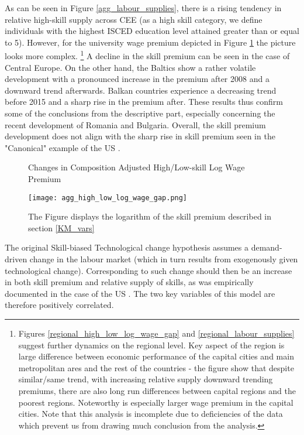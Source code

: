 \documentclass[11pt]{article}
\begin{document}
As can be seen in Figure \ref{agg_labour_supplies}, there is a rising tendency in relative high-skill supply across CEE (as a high skill category, we define individuals with the highest ISCED education level attained greater than or equal to 5). However, for the university wage premium depicted in Figure \ref{agg_high_low_log_wage_gap} the picture looks more complex.%
\footnote{Figures \ref{regional_high_low_log_wage_gap} and  \ref{regional_labour_supplies} suggest further dynamics on the regional level. Key aspect of the region is large difference between economic performance of the capital cities and main metropolitan ares and the rest of the countries - the figure show that despite similar/same trend, with increasing relative supply downward trending premiums, there are also long run differences between capital regions and the poorest regions. Noteworthy is especially larger wage premium in the capital cities. Note that this analysis is incomplete due to deficiencies of the data which prevent us from drawing much conclusion from the analysis.} 
A decline in the skill premium can be seen in the case of Central Europe. On the other hand, the Baltics show a rather volatile development with a pronounced increase in the premium after 2008 and a downward trend afterwards. Balkan countries experience a decreasing trend before 2015 and a sharp rise in the premium after. These results thus confirm some of the conclusions from the descriptive part, especially concerning the recent development of Romania and Bulgaria.
Overall, the skill premium development does not align with the sharp rise in skill premium seen in the "Canonical" example of the US \citep{acemoglu2002directed}. 

\begin{figure}[!htbp]%
    \centering
    \caption{Changes in Composition Adjusted High/Low-skill Log Wage Premium}
    {\texttt{[image: agg\_high\_low\_log\_wage\_gap.png]} }
    \label{agg_high_low_log_wage_gap}
    \caption*{\footnotesize The Figure displays the logarithm of the skill premium described in section \ref{KM_vars}}
\end{figure}

The original Skill-biased Technological change hypothesis assumes a demand-driven change in the labour market (which in turn results from exogenously given technological change). Corresponding to such change should then be an increase in both skill premium and relative supply of skills, as was empirically documented in the case of the US \citep{acemoglu2011skills}. The two key variables of this model are therefore positively correlated. 
\end{document}
